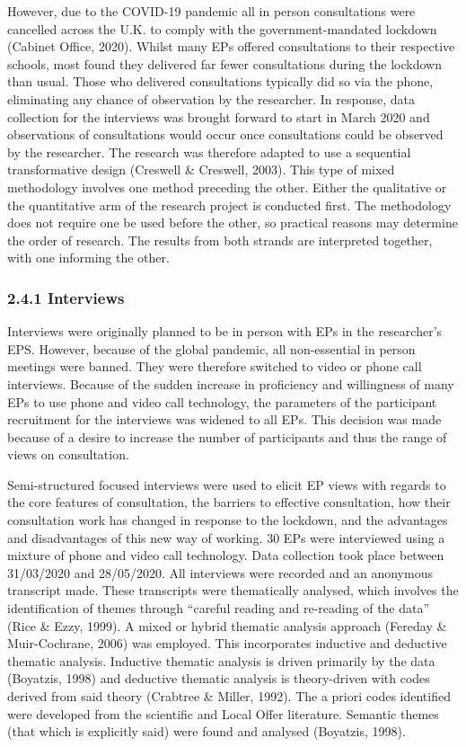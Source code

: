 \documentclass[
  english,
  man]{apa}
\begin{document}
However, due to the COVID-19 pandemic all in person consultations were cancelled across the U.K. to comply with the government-mandated lockdown (Cabinet Office, 2020). Whilst many EPs offered consultations to their respective schools, most found they delivered far fewer consultations during the lockdown than usual. Those who delivered consultations typically did so via the phone, eliminating any chance of observation by the researcher. In response, data collection for the interviews was brought forward to start in March 2020 and observations of consultations would occur once consultations could be observed by the researcher. The research was therefore adapted to use a sequential transformative design (Creswell \& Creswell, 2003). This type of mixed methodology involves one method preceding the other. Either the qualitative or the quantitative arm of the research project is conducted first. The methodology does not require one be used before the other, so practical reasons may determine the order of research. The results from both strands are interpreted together, with one informing the other.

\hypertarget{interviews-1}{%
\subsubsection{2.4.1 Interviews}\label{interviews-1}}

Interviews were originally planned to be in person with EPs in the researcher's EPS. However, because of the global pandemic, all non-essential in person meetings were banned. They were therefore switched to video or phone call interviews. Because of the sudden increase in proficiency and willingness of many EPs to use phone and video call technology, the parameters of the participant recruitment for the interviews was widened to all EPs. This decision was made because of a desire to increase the number of participants and thus the range of views on consultation.

Semi-structured focused interviews were used to elicit EP views with regards to the core features of consultation, the barriers to effective consultation, how their consultation work has changed in response to the lockdown, and the advantages and disadvantages of this new way of working. 30 EPs were interviewed using a mixture of phone and video call technology. Data collection took place between 31/03/2020 and 28/05/2020. All interviews were recorded and an anonymous transcript made. These transcripts were thematically analysed, which involves the identification of themes through ``careful reading and re-reading of the data'' (Rice \& Ezzy, 1999). A mixed or hybrid thematic analysis approach (Fereday \& Muir-Cochrane, 2006) was employed. This incorporates inductive and deductive thematic analysis. Inductive thematic analysis is driven primarily by the data (Boyatzis, 1998) and deductive thematic analysis is theory-driven with codes derived from said theory (Crabtree \& Miller, 1992). The a priori codes identified were developed from the scientific and Local Offer literature. Semantic themes (that which is explicitly said) were found and analysed (Boyatzis, 1998).
\end{document}
